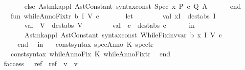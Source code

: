 \begin{isabellebody}
\ \ \ \ \ \ \ \ else\ Ast{\isachardot}mk{\isacharunderscore}appl\ {\isacharparenleft}Ast{\isachardot}Constant\ {\isacharat}{\isacharbraceleft}syntax{\isacharunderscore}const\ {\isachardoublequote}{\isacharunderscore}Spec{\isachardoublequote}{\isacharbraceright}{\isacharparenright}\ {\isacharbrackleft}x{\isacharprime}{\isacharcomma}\ P{\isacharprime}{\isacharcomma}\ c{\isacharprime}{\isacharcomma}\ Q{\isacharprime}{\isacharcomma}\ A{\isacharprime}{\isacharbrackright}\isanewline
\ \ \ \ \ \ end{\isacharsemicolon}\isanewline
\ \ \ \ fun\ whileAnnoFix{\isacharunderscore}tr{\isacharprime}\ {\isacharbrackleft}b{\isacharcomma}\ I{\isacharcomma}\ V{\isacharcomma}\ c{\isacharbrackright}\ {\isacharequal}\isanewline
\ \ \ \ \ \ let\isanewline
\ \ \ \ \ \ \ \ val\ {\isacharparenleft}x{\isacharprime}{\isacharcomma}I{\isacharprime}{\isacharparenright}\ {\isacharequal}\ dest{\isacharunderscore}abs\ I{\isacharsemicolon}\isanewline
\ \ \ \ \ \ \ \ val\ {\isacharparenleft}{\isacharunderscore}\ {\isacharcomma}V{\isacharprime}{\isacharparenright}\ {\isacharequal}\ dest{\isacharunderscore}abs\ V{\isacharsemicolon}\isanewline
\ \ \ \ \ \ \ \ val\ {\isacharparenleft}{\isacharunderscore}\ {\isacharcomma}c{\isacharprime}{\isacharparenright}\ {\isacharequal}\ dest{\isacharunderscore}abs\ c{\isacharsemicolon}\isanewline
\ \ \ \ \ \ in\isanewline
\ \ \ \ \ \ \ \ Ast{\isachardot}mk{\isacharunderscore}appl\ {\isacharparenleft}Ast{\isachardot}Constant\ {\isacharat}{\isacharbraceleft}syntax{\isacharunderscore}const\ {\isachardoublequote}{\isacharunderscore}WhileFix{\isacharunderscore}inv{\isacharunderscore}var{\isachardoublequote}{\isacharbraceright}{\isacharparenright}\ {\isacharbrackleft}b{\isacharcomma}\ x{\isacharprime}{\isacharcomma}\ I{\isacharprime}{\isacharcomma}\ V{\isacharprime}{\isacharcomma}\ c{\isacharprime}{\isacharbrackright}\isanewline
\ \ \ \ \ \ end{\isacharsemicolon}\isanewline
\ \ in\isanewline
\ \ \ {\isacharbrackleft}{\isacharparenleft}{\isacharat}{\isacharbraceleft}const{\isacharunderscore}syntax\ specAnno{\isacharbraceright}{\isacharcomma}\ K\ spec{\isacharunderscore}tr{\isacharprime}{\isacharparenright}{\isacharcomma}\isanewline
\ \ \ \ {\isacharparenleft}{\isacharat}{\isacharbraceleft}const{\isacharunderscore}syntax\ whileAnnoFix{\isacharbraceright}{\isacharcomma}\ K\ whileAnnoFix{\isacharunderscore}tr{\isacharprime}{\isacharparenright}{\isacharbrackright}\isanewline
\ \ end\isanewline
{\isacartoucheclose}%
\endisatagML
{\isafoldML}%
%
\isadelimML
\isanewline
%
\endisadelimML
\isanewline
\isanewline
\isanewline
{}\isamarkupfalse%
\isanewline
\ \ {\isachardoublequoteopen}{\isacharunderscore}faccess{\isachardoublequoteclose}\ \ {\isacharcolon}{\isacharcolon}\ {\isachardoublequoteopen}{\isacharprime}ref\ {\isasymRightarrow}\ {\isacharparenleft}{\isacharprime}ref\ {\isasymRightarrow}\ {\isacharprime}v{\isacharparenright}\ {\isasymRightarrow}\ {\isacharprime}v{\isachardoublequoteclose}\isanewline

\end{isabellebody}
